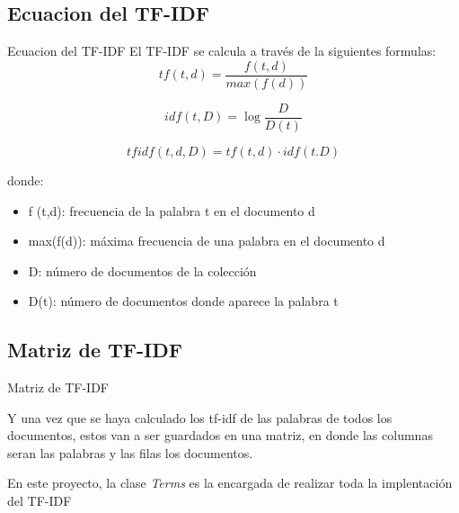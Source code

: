 \subsection{Ecuacion del TF-IDF}
\begin{frame}{Ecuacion del TF-IDF}
    El TF-IDF se calcula a través de la siguientes formulas:
    \begin{equation}
        tf(t,d) = \frac{f(t,d)}{max(f(d))}
    \end{equation}

    \begin{equation}
        idf(t,D) = \log\frac{D}{D(t)}
    \end{equation}

    \begin{equation}
        tfidf(t,d,D) = tf(t,d) \cdot idf(t.D)
    \end{equation}

    donde:
    \begin{itemize}
        \item f (t,d): frecuencia de la palabra t en el documento d 
        \item max(f(d)): máxima frecuencia de una palabra en el documento d
        \item D: número de documentos de la colección 
        \item D(t): número de documentos donde aparece la palabra t
    \end{itemize}
\end{frame}

\subsection{Matriz de TF-IDF}
\begin{frame}{Matriz de TF-IDF}
    \begin{center}
        Y una vez que se haya calculado los tf-idf de las palabras de todos los documentos, estos van a ser guardados
        en una matriz, en donde las columnas seran las palabras y las filas los documentos.

        \vspace*{1.5cm}

        En este proyecto, la clase \textit{Terms} es la encargada de realizar toda la implentación del TF-IDF
    \end{center}
\end{frame}